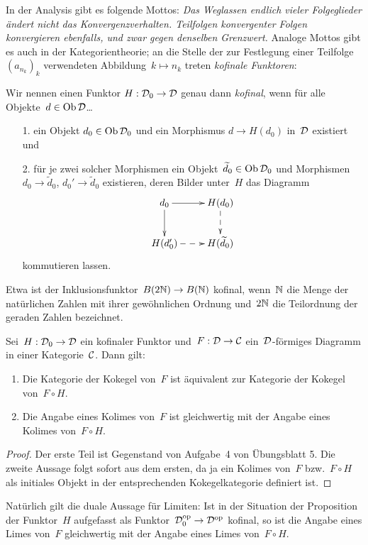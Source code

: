 In der Analysis gibt es folgende Mottos: \emph{Das Weglassen endlich vieler Folgeglieder
ändert nicht das Konvergenzverhalten. Teilfolgen konvergenter Folgen
konvergieren ebenfalls, und zwar gegen denselben Grenzwert.} Analoge Mottos
gibt es auch in der Kategorientheorie; an die Stelle der zur Festlegung einer
Teilfolge~$(a_{n_k})_k$ verwendeten Abbildung~$k \mapsto n_k$ treten
\emph{kofinale Funktoren}:

\begin{defn}
Wir nennen einen Funktor $H : \mathcal{D}_0 \to \mathcal{D}$ genau dann \emph{kofinal}, wenn
für alle Objekte~$d \in \operatorname{Ob}\mathcal{D}$\ldots
\begin{enumerate}
\item[1.] ein Objekt $d_0 \in \operatorname{Ob}\mathcal{D}_0$ und ein Morphismus $d \to
H(d_0)$ in~$\mathcal{D}$ existiert und
\item[2.] für je zwei solcher Morphismen ein Objekt~$\widetilde d_0 \in \operatorname{Ob}\mathcal{D}_0$ und
Morphismen $d_0 \to \widetilde d_0$, $d_0' \to \widetilde d_0$ existieren, deren Bilder
unter~$H$ das Diagramm
\[ \xymatrix{
  d_0 \ar[r] \ar[d] & H(d_0) \ar@{-->}[d] \\
  H(d_0') \ar@{-->}[r] & H(\widetilde d_0)
} \]
kommutieren lassen.
\end{enumerate}
\end{defn}

Etwa ist der Inklusionsfunktor~$B (2\mathbb{N}) \to B(\mathbb{N})$ kofinal, wenn~$\mathbb{N}$ die
Menge der natürlichen Zahlen mit ihrer gewöhnlichen Ordnung und~$2\mathbb{N}$ die
Teilordnung der geraden Zahlen bezeichnet.

\begin{prop}
Sei~$H : \mathcal{D}_0 \to \mathcal{D}$ ein kofinaler Funktor und~$F : \mathcal{D} \to \mathcal{C}$
ein~$\mathcal{D}$-förmiges Diagramm in einer Kategorie~$\mathcal{C}$. Dann gilt:
\begin{enumerate}
\item Die Kategorie der Kokegel von~$F$ ist äquivalent zur Kategorie der
Kokegel von~$F \circ H$.
\item Die Angabe eines Kolimes von~$F$ ist gleichwertig mit der Angabe eines
Kolimes von~$F \circ H$.
\end{enumerate}
\end{prop}
\begin{proof}
Der erste Teil ist Gegenstand von Aufgabe~4 von Übungsblatt 5. Die zweite
Aussage folgt sofort aus dem ersten, da ja ein Kolimes von~$F$ bzw.~$F \circ H$
als initiales Objekt in der entsprechenden Kokegelkategorie definiert ist.
\end{proof}

Natürlich gilt die duale Aussage für Limiten: Ist in der Situation der
Proposition der Funktor~$H$ aufgefasst als Funktor~$\mathcal{D}_0^{\mathrm{op}} \to \mathcal{D}^{\mathrm{op}}$
kofinal, so ist die Angabe eines Limes von~$F$ gleichwertig mit der Angabe
eines Limes von~$F \circ H$.

